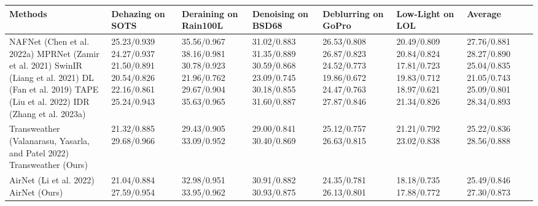 \begin{tabular}{lllllll}
\toprule
Methods & Dehazing on SOTS & Deraining on Rain100L & Denoising on BSD68 & Deblurring on GoPro & Low-Light on LOL & Average \\
\midrule
NAFNet (Chen et al. 2022a) MPRNet (Zamir et al. 2021) SwinIR (Liang et al. 2021) DL (Fan et al. 2019) TAPE (Liu et al. 2022) IDR (Zhang et al. 2023a) & 25.23/0.939 24.27/0.937 21.50/0.891 20.54/0.826 22.16/0.861 25.24/0.943 & 35.56/0.967 38.16/0.981 30.78/0.923 21.96/0.762 29.67/0.904 35.63/0.965 & 31.02/0.883 31.35/0.889 30.59/0.868 23.09/0.745 30.18/0.855 31.60/0.887 & 26.53/0.808 26.87/0.823 24.52/0.773 19.86/0.672 24.47/0.763 27.87/0.846 & 20.49/0.809 20.84/0.824 17.81/0.723 19.83/0.712 18.97/0.621 21.34/0.826 & 27.76/0.881 28.27/0.890 25.04/0.835 21.05/0.743 25.09/0.801 28.34/0.893 \\
Transweather (Valanarasu, Yasarla, and Patel 2022) Transweather (Ours) & 21.32/0.885 29.68/0.966 & 29.43/0.905 33.09/0.952 & 29.00/0.841 30.40/0.869 & 25.12/0.757 26.63/0.815 & 21.21/0.792 23.02/0.838 & 25.22/0.836 28.56/0.888 \\
AirNet (Li et al. 2022) AirNet (Ours) & 21.04/0.884 27.59/0.954 & 32.98/0.951 33.95/0.962 & 30.91/0.882 30.93/0.875 & 24.35/0.781 26.13/0.801 & 18.18/0.735 17.88/0.772 & 25.49/0.846 27.30/0.873 \\
\bottomrule
\end{tabular}
